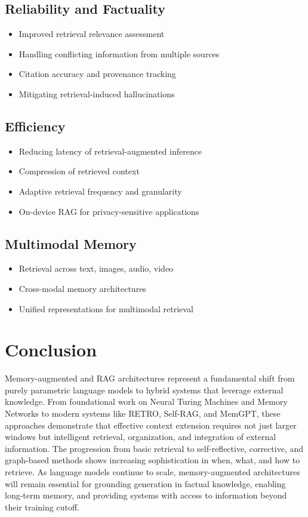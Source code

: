 \documentclass[11pt,letterpaper]{article}
\begin{document}
\subsection{Reliability and Factuality}
\begin{itemize}[leftmargin=*]
    \item Improved retrieval relevance assessment
    \item Handling conflicting information from multiple sources
    \item Citation accuracy and provenance tracking
    \item Mitigating retrieval-induced hallucinations
\end{itemize}

\subsection{Efficiency}
\begin{itemize}[leftmargin=*]
    \item Reducing latency of retrieval-augmented inference
    \item Compression of retrieved context
    \item Adaptive retrieval frequency and granularity
    \item On-device RAG for privacy-sensitive applications
\end{itemize}

\subsection{Multimodal Memory}
\begin{itemize}[leftmargin=*]
    \item Retrieval across text, images, audio, video
    \item Cross-modal memory architectures
    \item Unified representations for multimodal retrieval
\end{itemize}

\section{Conclusion}

Memory-augmented and RAG architectures represent a fundamental shift from purely parametric language models to hybrid systems that leverage external knowledge. From foundational work on Neural Turing Machines and Memory Networks to modern systems like RETRO, Self-RAG, and MemGPT, these approaches demonstrate that effective context extension requires not just larger windows but intelligent retrieval, organization, and integration of external information. The progression from basic retrieval to self-reflective, corrective, and graph-based methods shows increasing sophistication in when, what, and how to retrieve. As language models continue to scale, memory-augmented architectures will remain essential for grounding generation in factual knowledge, enabling long-term memory, and providing systems with access to information beyond their training cutoff.
\end{document}
